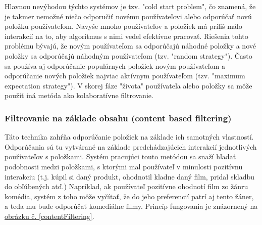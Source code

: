 Hlavnou nevýhodou týchto systémov je tzv. "cold start problem", čo znamená, že je takmer nemožné niečo odporučiť novému používateľovi alebo odporúčať novú položku používateľom. Navyše mnoho používateľov a položiek má príliš málo interakcií na to, aby algoritmus s nimi vedel efektívne pracovať. Riešenia tohto problému bývajú, že novým používateľom sa odporúčajú náhodné položky a nové položky sa odporúčajú náhodným používateľom (tzv. "random strategy"). Často sa používa aj odporúčanie populárnych položiek novým používateľom a odporúčanie nových položiek najviac aktívnym používateľom (tzv. "maximum expectation strategy"). V skorej fáze "života" používateľa alebo položky sa môže použiť iná metóda ako kolaboratívne filtrovanie. \cite{rs2} \\
	
 
\subsubsection{Filtrovanie na základe obsahu (content based filtering)}
\label{sec:contentbased}
Táto technika zahŕňa odporúčanie položiek na základe ich samotných vlastností. \cite{rs3} Odporúčania sú tu vytvárané na základe predchádzajúcich interakcií jednotlivých používateľov s položkami. Systém pracujúci touto metódou sa snaží hľadať podobnosti medzi položkami, s ktorými mal používateľ v minulosti pozitívnu interakciu (t.j. kúpil si daný produkt, ohodnotil kladne daný film, pridal skladbu do obľúbených atď.) Napríklad, ak používateľ pozitívne ohodnotí film zo žánru komédia, systém z toho môže vyčítať, že do jeho preferencií patrí aj tento žáner, a teda mu bude odporúčať komediálne filmy. \cite{rs1} Princíp fungovania je znázornený na \hyperref[contentFiltering]{obrázku č. \ref{contentFiltering}}.

